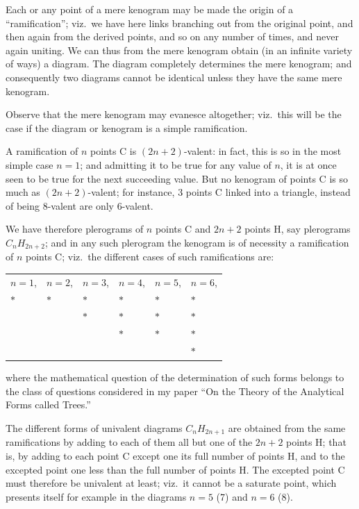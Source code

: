 \documentclass[11pt,a4paper]{book}
\begin{document}
Each or any point of a mere kenogram may be made the origin of a ``ramification''; viz.\ we have here links branching out from the original point, and then again from the derived points, and so on any number of times, and never again uniting. We can thus from the mere kenogram obtain (in an infinite variety of ways) a diagram. The diagram completely determines the mere kenogram; and consequently two diagrams cannot be identical unless they have the same mere kenogram.

Observe that the mere kenogram may evanesce altogether; viz.\ this will be the case if the diagram or kenogram is a simple ramification.

A ramification of $n$ points C is $(2n + 2)$-valent: in fact, this is so in the most simple case $n = 1$; and admitting it to be true for any value of $n$, it is at once seen to be true for the next succeeding value. But no kenogram of points C is so much as $(2n + 2)$-valent; for instance, 3 points C linked into a triangle, instead of being 8-valent are only 6-valent.

We have therefore plerograms of $n$ points C and $2n + 2$ points H, say plerograms $C_n H_{2n+2}$; and in any such plerogram the kenogram is of necessity a ramification of $n$ points C; viz.\ the different cases of such ramifications are:

\begin{center}
\begin{tabular}{llllll}
$n = 1$, & $n = 2$, & $n = 3$, & $n = 4$, & $n = 5$, & $n = 6$, \\
$*$ & $*$ & $*$ & $*$ & $*$ & $*$ \\
& & $*$ & $*$ & $*$ & $*$ \\
& & & $*$ & $*$ & $*$ \\
& & & & & $*$
\end{tabular}
\end{center}

where the mathematical question of the determination of such forms belongs to the class of questions considered in my paper ``On the Theory of the Analytical Forms called Trees.''

The different forms of univalent diagrams $C_n H_{2n+1}$ are obtained from the same ramifications by adding to each of them all but one of the $2n + 2$ points H; that is, by adding to each point C except one its full number of points H, and to the excepted point one less than the full number of points H. The excepted point C must therefore be univalent at least; viz.\ it cannot be a saturate point, which presents itself for example in the diagrams $n = 5$ (7) and $n = 6$ (8).
\end{document}
